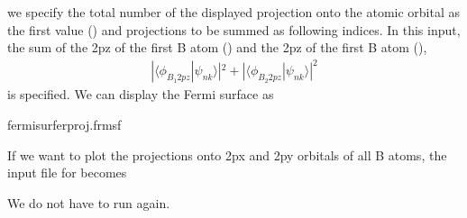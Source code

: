 \documentclass[letterpaper,10pt,pdftex,openany,english]{sphinxmanual}
\begin{document}
\sphinxAtStartPar
we specify the total number of the displayed projection onto the atomic orbital
as the first value () and projections to be summed as
following indices.
In this input, the sum of the 2pz of the first B atom ()
and the 2pz of the first B atom (),
\begin{equation*}
\begin{split}|\langle \phi_{B_1 2pz} | \psi_{nk} \rangle|^2
+ |\langle \phi_{B_2 2pz} | \psi_{nk} \rangle|^2\end{split}
\end{equation*}
\sphinxAtStartPar
is specified. We can display the Fermi surface as

\begin{sphinxVerbatim}[commandchars=\\\{\}]
\PYGZdl{}fermisurferproj.frmsf
\end{sphinxVerbatim}

\begin{figure}[htbp]
\centering

\noindent{}
\end{figure}

\sphinxAtStartPar
If we want to plot the projections onto 2px and 2py orbitals of all B atoms,
the input file for  becomes

\begin{sphinxVerbatim}[commandchars=\\\{\}]
  
   
\end{sphinxVerbatim}

\sphinxAtStartPar
We do not have to run  again.

\begin{figure}[htbp]
\centering

\noindent{}
\end{figure}
\end{document}
